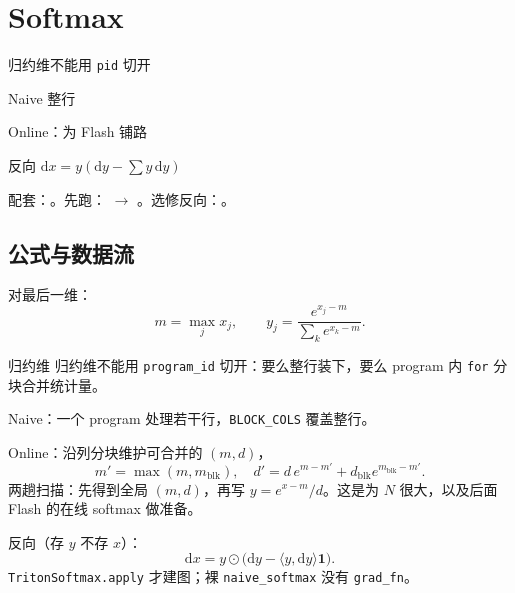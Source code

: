 \chapter{Softmax}

\begin{introduction}
  \item 归约维不能用 \texttt{pid} 切开
  \item Naive 整行
  \item Online：为 Flash 铺路
  \item 反向 $\mathrm{d}x=y(\mathrm{d}y-\sum y\,\mathrm{d}y)$
\end{introduction}

配套：。先跑： $\to$ 。选修反向：。

\section{公式与数据流}

对最后一维：
\[
m=\max_j x_j,\qquad y_j=\frac{e^{x_j-m}}{\sum_k e^{x_k-m}}.
\]

\begin{proposition}{归约维}
归约维不能用 \texttt{program\_id} 切开：要么整行装下，要么 program 内 \texttt{for} 分块合并统计量。
\end{proposition}

\figsoftmax

Naive：一个 program 处理若干行，\texttt{BLOCK\_COLS} 覆盖整行。


Online：沿列分块维护可合并的 $(m,d)$，
\[
m'=\max(m,m_{\mathrm{blk}}),\quad
d'=d\,e^{m-m'}+d_{\mathrm{blk}}e^{m_{\mathrm{blk}}-m'}.
\]
两趟扫描：先得到全局 $(m,d)$，再写 $y=e^{x-m}/d$。这是为 $N$ 很大，以及后面 Flash 的在线 softmax 做准备。

\figonline


反向（存 $y$ 不存 $x$）：
\[
\mathrm{d}x=y\odot\bigl(\mathrm{d}y-\langle y,\mathrm{d}y\rangle\mathbf{1}\bigr).
\]
\texttt{TritonSoftmax.apply} 才建图；裸 \texttt{naive\_softmax} 没有 \texttt{grad\_fn}。


